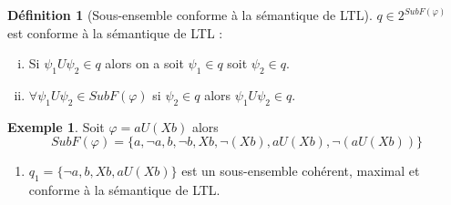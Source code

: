 \documentclass[12pt,a4paper]{article}
\theoremstyle{plain}
\theoremstyle{definition}
\newtheorem{defi}{Définition}
\newtheorem{ex}{Exemple}
\begin{document}
\begin{defi}[Sous-ensemble conforme à la sémantique de LTL]
  \label{ss-ens-ok-ltl}
  $q \in 2^{SubF(\varphi)}$ est conforme à la sémantique de LTL :
  \begin{enumerate}[(i)]
  \item Si $\psi_1 U \psi_2 \in q$ alors on a soit $\psi_1 \in q$ soit $\psi_2 \in q$.
  \item $\forall \psi_1 U \psi_2 \in SubF(\varphi)$ si $\psi_2 \in q$ alors $\psi_1 U \psi_2 \in q$.
  \end{enumerate}
\end{defi}

\begin{ex}
  Soit $\varphi = a U (Xb)$ alors
  \[
    SubF(\varphi) = \{a, \lnot a, b, \lnot b, Xb, \lnot (Xb), a U (Xb), \lnot (aU(Xb))\}
  \]
  \begin{enumerate}
  \item $q_1 = \{\lnot a, b, Xb, a U (Xb)\}$ est un sous-ensemble cohérent, maximal et conforme à la sémantique de LTL.
  \end{enumerate}
\end{ex}
\end{document}
